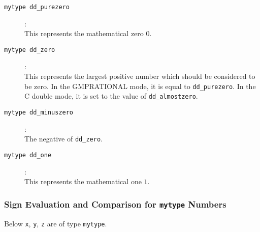 \documentclass[11pt]{article}
\newcommand {\0} {{\bf 0}}
\begin{document}
\begin{description}

\item[{\tt mytype dd\_purezero}]:\\
This represents the mathematical zero $0$.

\item[{\tt mytype dd\_zero}]:\\
This represents the largest positive number which should be considered to be zero.  In the GMPRATIONAL
mode, it is equal to {\tt dd\_purezero}.   In the C double mode, it is set to the value of {\tt dd\_almostzero}.

\item[{\tt mytype dd\_minuszero}]:\\
The negative of {\tt dd\_zero}.

\item[{\tt mytype dd\_one}]:\\
This represents the mathematical one $1$.


\end{description}

\subsubsection{Sign Evaluation and Comparison for {\tt mytype} Numbers}

Below {\tt x}, {\tt y}, {\tt z} are of type {\tt mytype}.
\end{document}
